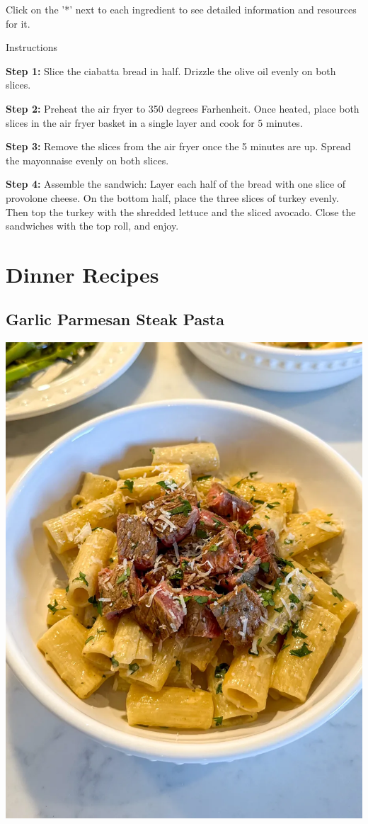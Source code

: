 \documentclass[
]{book}
\begin{document}
Click on the '*' next to each ingredient to see detailed information and
resources for it.

Instructions

\textbf{Step 1:} Slice the ciabatta bread in half. Drizzle the olive oil
evenly on both slices.

\textbf{Step 2:} Preheat the air fryer to 350 degrees Farhenheit. Once
heated, place both slices in the air fryer basket in a single layer and
cook for 5 minutes.

\textbf{Step 3:} Remove the slices from the air fryer once the 5 minutes
are up. Spread the mayonnaise evenly on both slices.

\textbf{Step 4:} Assemble the sandwich: Layer each half of the bread
with one slice of provolone cheese. On the bottom half, place the three
slices of turkey evenly. Then top the turkey with the shredded lettuce
and the sliced avocado. Close the sandwiches with the top roll, and
enjoy.

\chapter{Dinner Recipes}\label{dinner-recipes}

\section*{Garlic Parmesan Steak
Pasta}\label{garlic-parmesan-steak-pasta}

\includegraphics{gpsp.jpg}
\end{document}
